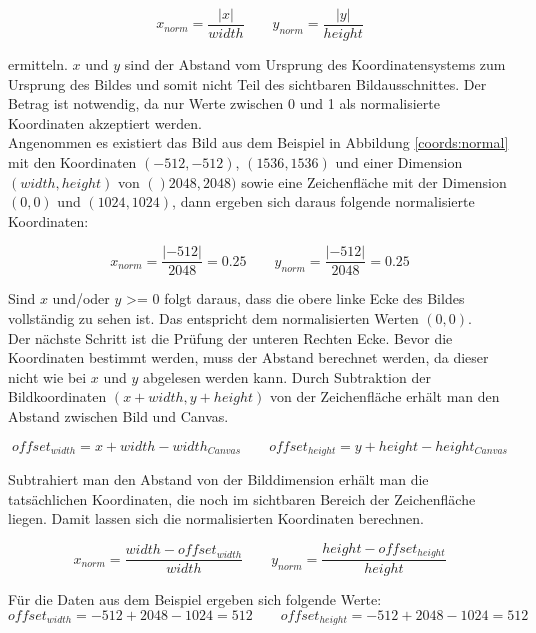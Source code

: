 \begin{equation}
 x_{norm} = \frac{|x|}{width} \qquad
 y_{norm} = \frac{|y|}{height}
\end{equation}

ermitteln. $x$ und $y$ sind der Abstand vom Ursprung des Koordinatensystems zum Ursprung des Bildes und somit nicht Teil des sichtbaren Bildausschnittes. Der Betrag ist notwendig, da nur Werte zwischen 0 und 1 als normalisierte Koordinaten akzeptiert werden.\\
Angenommen es existiert das Bild aus dem Beispiel in Abbildung \ref{coords:normal} mit den Koordinaten $(-512, -512)$, $(1536, 1536)$ und einer Dimension $(width, height)$ von $()2048, 2048)$ sowie eine Zeichenfläche mit der Dimension $(0, 0)$ und $(1024, 1024)$, dann ergeben sich daraus folgende normalisierte Koordinaten:

\begin{equation}
 x_{norm} = \frac{|-512|}{2048} = 0.25\qquad
 y_{norm} = \frac{|-512|}{2048} = 0.25
\end{equation}

Sind $x$ und/oder $y$ \textgreater= 0 folgt daraus, dass die obere linke Ecke des Bildes vollständig zu sehen ist. Das entspricht dem normalisierten Werten $(0, 0)$.\\
Der nächste Schritt ist die Prüfung der unteren Rechten Ecke. Bevor die Koordinaten bestimmt werden, muss der Abstand berechnet werden, da dieser nicht wie bei $x$ und $y$ abgelesen werden kann. Durch Subtraktion der Bildkoordinaten $(x+width, y+height)$ von der Zeichenfläche erhält man den Abstand zwischen Bild und Canvas.

\begin{equation}
 offset_{width} = x + width - width_{Canvas}\qquad
 offset_{height} = y + height - height_{Canvas}
\end{equation}

Subtrahiert man den Abstand von der Bilddimension erhält man die tatsächlichen Koordinaten, die noch im sichtbaren Bereich der Zeichenfläche liegen. Damit lassen sich die normalisierten Koordinaten berechnen.

\begin{equation}
 x_{norm} = \frac{width - offset_{width}}{width} \qquad
 y_{norm} = \frac{height - offset_{height}}{height}
\end{equation}

Für die Daten aus dem Beispiel ergeben sich folgende Werte:
\begin{equation}
 offset_{width} = -512 + 2048 -1024 = 512\qquad
 offset_{height} = -512 + 2048 -1024 = 512
\end{equation}

